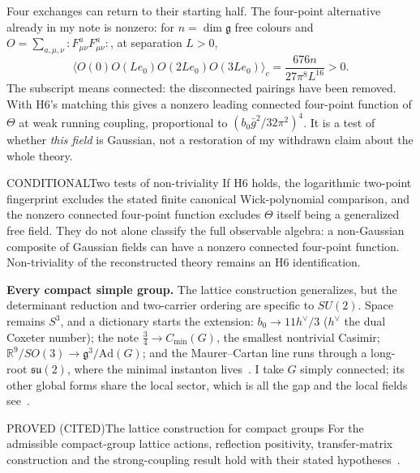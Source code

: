 Four exchanges can return to their starting half. The four-point alternative already in my note is nonzero:
for $n=\dim\mathfrak g$ free colours and $O=\sum_{a,\mu,\nu}:F^a_{\mu\nu}F^a_{\mu\nu}:$, at separation $L>0$,
\[
\langle O(0)O(Le_0)O(2Le_0)O(3Le_0)\rangle_c
=\frac{676n}{27\pi^8L^{16}}>0.
\]
The subscript means connected: the disconnected pairings have been removed. With H6's matching this gives a
nonzero leading connected four-point function of $\Theta$ at weak running coupling, proportional to
$(b_0\bar g^2/32\pi^2)^4$. It is a test of whether \emph{this field} is Gaussian, not a restoration of my withdrawn
claim about the whole theory.

\begin{claim}{CONDITIONAL}{Two tests of non-triviality}\label{b:nontrivial}
If H6 holds, the logarithmic two-point fingerprint excludes the stated finite canonical Wick-polynomial comparison,
and the nonzero connected four-point function excludes $\Theta$ itself being a generalized free field.
They do not alone classify the full observable algebra: a non-Gaussian composite of Gaussian fields can have
a nonzero connected four-point function. Non-triviality of the reconstructed theory remains an H6 identification.
\end{claim}

\textbf{Every compact simple group.} The lattice construction generalizes, but the determinant reduction and two-carrier
ordering are specific to $SU(2)$. Space remains $S^3$, and a dictionary starts the extension: $b_0\to11h^\vee/3$
($h^\vee$ the dual Coxeter number); the note $\tfrac34\to
C_{\min}(G)$, the smallest nontrivial Casimir; $\mathbb R^9/SO(3)\to\mathfrak g^3/\mathrm{Ad}(G)$; and the
Maurer--Cartan line runs through a long-root $\mathfrak{su}(2)$, where the minimal instanton lives~\cite{BPST75,BCGW77}.
I take $G$ simply connected; its other global forms share the local sector, which is all the gap and the local fields
see~\cite{AharonySeibergTachikawa13}.

\begin{claim}{PROVED (CITED)}{The lattice construction for compact groups}\label{b:everyGlat}
For the admissible compact-group lattice actions, reflection positivity, transfer-matrix construction and the
strong-coupling result hold with their stated hypotheses~\cite{OsterwalderSeiler78}.
\end{claim}

